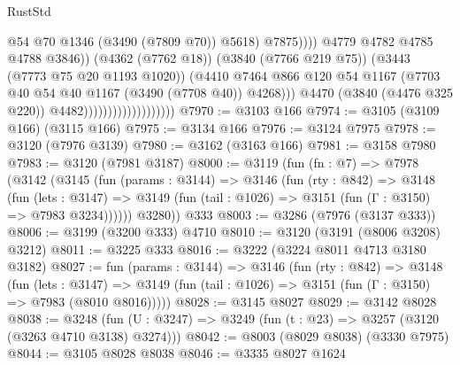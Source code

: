 \begin{lexlean}{RustStd}
\begin{coremodule}
{\begin{coremodule}
{{{{{{{{{{{{{{{{{{{{{{{{{{                                                          @54
                                                          @70
                                                          @1346
                                                          (@3490 (@7809 @70))
                                                          @5618)
                                                        @7875))))
                                                @4779
                                                @4782
                                                @4785
                                                @4788
                                                @3846))
                                            (@4362 (@7762 @18))
                                            (@3840 (@7766 @219 @75))
                                            (@3443 (@7773 @75 @20 @1193 @1020))
                                            (@4410
                                              @7464
                                              @866
                                              @120
                                              @54
                                              @1167
                                              (@7703 @40 @54 @40 @1167 (@3490 (@7708 @40)) @4268)))
                                          @4470
                                          (@3840 (@4476 @325 @220))
                                          @4482)))))))))))))))))))
@7970 := @3103 @166
@7974 := @3105 (@3109 @166) (@3115 @166)
@7975 := @3134 @166
@7976 := @3124 @7975
@7978 := @3120 (@7976 @3139)
@7980 := @3162 (@3163 @166)
@7981 := @3158 @7980
@7983 := @3120 (@7981 @3187)
@8000 := @3119
    (fun (fn : @7) =>
    @7978
      (@3142
        (@3145
          (fun (params : @3144) =>
          @3146
            (fun (rty : @842) =>
            @3148
              (fun (lets : @3147) =>
              @3149 (fun (tail : @1026) => @3151 (fun (Γ : @3150) => @7983 @3234))))))
        @3280))
    @333
@8003 := @3286 (@7976 (@3137 @333))
@8006 := @3199 (@3200 @333) @4710
@8010 := @3120 (@3191 (@8006 @3208) @3212)
@8011 := @3225 @333
@8016 := @3222 (@3224 @8011 @4713 @3180 @3182)
@8027 := fun (params : @3144) =>
  @3146
    (fun (rty : @842) =>
    @3148
      (fun (lets : @3147) =>
      @3149 (fun (tail : @1026) => @3151 (fun (Γ : @3150) => @7983 (@8010 @8016)))))
@8028 := @3145 @8027
@8029 := @3142 @8028
@8038 := @3248 (fun (U : @3247) => @3249 (fun (t : @23) => @3257 (@3120 (@3263 @4710 @3138) @3274)))
@8042 := @8003 (@8029 @8038) (@3330 @7975)
@8044 := @3105 @8028 @8038
@8046 := @3335 @8027 @1624
}}}}}}}}}}}}}}}}}}}}}}}}}}
\end{coremodule}}
\end{coremodule}
\end{lexlean}
